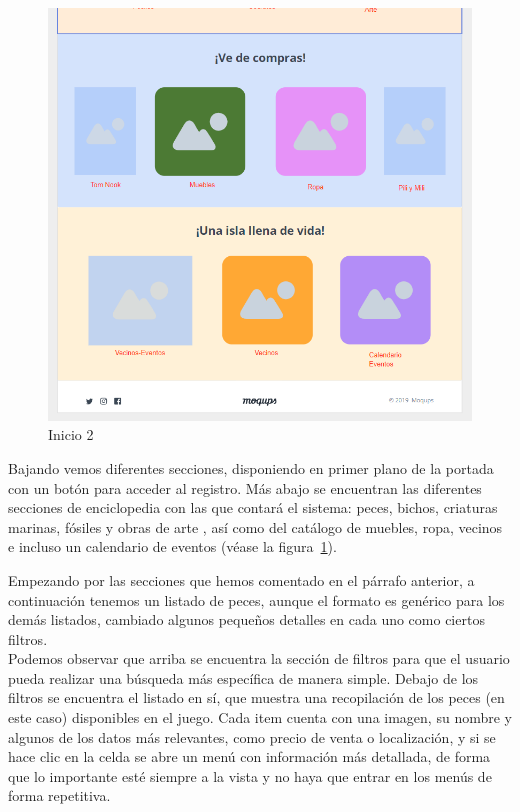 \begin{figure}[!htb]
\begin{minipage}{0.48\textwidth}
		\includegraphics[width=\linewidth]{img/mockups/Inicio - 2.png}
		\caption{Inicio 2}
		\label{fig:inicio2}
	\end{minipage}
\end{figure}

Bajando vemos diferentes secciones, disponiendo en primer plano de la portada con un botón para acceder al registro. Más abajo se encuentran las diferentes secciones de enciclopedia con las que contará el sistema: peces, bichos, criaturas marinas, fósiles y obras de arte , así como del catálogo de muebles, ropa, vecinos e incluso un calendario de eventos {(v\'ease la figura~\ref{fig:inicio2})}.\\

\clearpage

Empezando por las secciones que hemos comentado en el párrafo anterior, a continuación tenemos un listado de peces, aunque el formato es genérico para los demás listados, cambiado algunos pequeños detalles en cada uno como ciertos filtros.\\

Podemos observar que arriba se encuentra la sección de filtros para que el usuario pueda realizar una búsqueda más específica de manera simple. Debajo de los filtros se encuentra el listado en sí, que muestra una recopilación de los peces (en este caso) disponibles en el juego. Cada item cuenta con una imagen, su nombre y algunos de los datos más relevantes, como precio de venta o localización, y si se hace clic en la celda se abre un menú con información más detallada, de forma que lo importante esté siempre a la vista y no haya que entrar en los menús de forma repetitiva.\\
 
